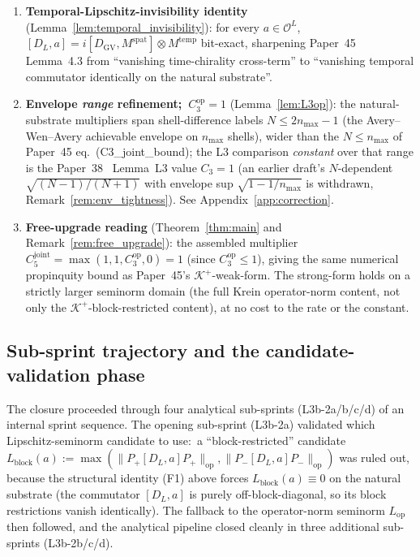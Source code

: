 \documentclass[11pt,a4paper]{article}
\theoremstyle{plain}
\theoremstyle{definition}
\newcommand{\nmax}{n_{\max}}
\newcommand{\Krein}{\mathcal{K}}
\newcommand{\Op}{\mathcal{O}}
\newcommand{\opnorm}[1]{\lVert #1 \rVert_{\mathrm{op}}}
\newcommand{\DGV}{D_{\mathrm{GV}}}
\newcommand{\DL}{D_{L}}
\newcommand{\Lop}{L_{\mathrm{op}}}
\newcommand{\Lblock}{L_{\mathrm{block}}}
\newcommand{\Cthreeop}{C_{3}^{\mathrm{op}}}
\newcommand{\Cfivejoint}{C_{5}^{\mathrm{joint}}}
\newcommand{\Kplus}{\Krein^{+}}
\newcommand{\Pplus}{P_{+}}
\newcommand{\Pminus}{P_{-}}
\newcommand{\spat}{\mathrm{spat}}
\newcommand{\temp}{\mathrm{temp}}
\begin{document}
\begin{enumerate}
\item[(F1)] \textbf{Temporal-Lipschitz-invisibility identity}
(Lemma~\ref{lem:temporal_invisibility}): for every $a \in \Op^{L}$,
$[\DL, a] = i[\DGV, M^{\spat}] \otimes M^{\temp}$ bit-exact, sharpening
Paper~45 Lemma~4.3 from ``vanishing time-chirality cross-term'' to
``vanishing temporal commutator identically on the natural substrate''.
\item[(F2)] \textbf{Envelope \emph{range} refinement;\ $\Cthreeop = 1$}
(Lemma~\ref{lem:L3op}): the natural-substrate multipliers span
shell-difference labels $N \le 2\nmax - 1$ (the Avery--Wen--Avery
achievable envelope on $\nmax$ shells), wider than the $N \le \nmax$ of
Paper~45 eq.~(C3\_joint\_bound); the L3 comparison \emph{constant} over
that range is the Paper~38~\cite{paper38} Lemma~L3 value $C_{3} = 1$ (an
earlier draft's $N$-dependent $\sqrt{(N-1)/(N+1)}$ with envelope sup
$\sqrt{1 - 1/\nmax}$ is withdrawn, Remark~\ref{rem:env_tightness}). See
Appendix~\ref{app:correction}.
\item[(F3)] \textbf{Free-upgrade reading} (Theorem~\ref{thm:main} and
Remark~\ref{rem:free_upgrade}): the assembled multiplier
$\Cfivejoint = \max(1, 1, \Cthreeop, 0) = 1$ (since $\Cthreeop \le 1$),
giving the same numerical propinquity bound as Paper~45's
$\Kplus$-weak-form. The strong-form holds on a strictly larger seminorm
domain (the full Krein operator-norm content, not only the
$\Kplus$-block-restricted content), at no cost to the rate or the
constant.
\end{enumerate}

\subsection{Sub-sprint trajectory and the candidate-validation phase}
\label{sec:sub_sprint_trajectory}

The closure proceeded through four analytical sub-sprints
(L3b-2a/b/c/d) of an internal sprint sequence. The opening sub-sprint
(L3b-2a) validated which Lipschitz-seminorm candidate to use:\ a
``block-restricted'' candidate $\Lblock(a) := \max(\opnorm{\Pplus [\DL, a] \Pplus},
\opnorm{\Pminus [\DL, a] \Pminus})$ was ruled out, because the
structural identity (F1) above forces $\Lblock(a) \equiv 0$ on the
natural substrate (the commutator $[\DL, a]$ is purely off-block-diagonal,
so its block restrictions vanish identically). The fallback to the
operator-norm seminorm $\Lop$ then followed, and the analytical pipeline
closed cleanly in three additional sub-sprints (L3b-2b/c/d).
\end{document}
